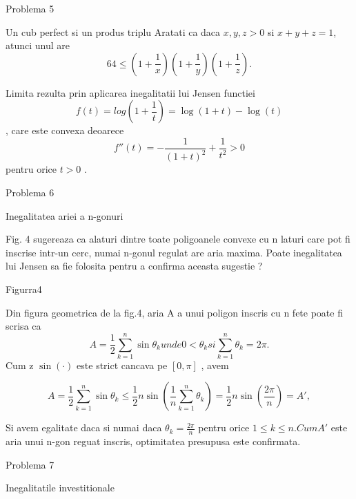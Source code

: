 \documentclass[a4paper,12pt,oneside]{report}
\begin{document}
Problema 5 

Un cub perfect si un produs triplu
Aratati ca daca \(x , y , z > 0\) si \(x+ y + z = 1\), atunci unul are 
\begin{displaymath}
  64 \leq \left ( 1 + \frac{1}{x} \right )\left ( 1 + \frac{1}{y} \right )\left ( 1 + \frac{1}{z} \right ). 
\end{displaymath}

Limita rezulta prin aplicarea inegalitatii lui Jensen functiei 
\begin{displaymath}
  f\left ( t \right ) = log \left ( 1+\frac{1}{t} \right ) = \log \left ( 1 + t \right ) - \log \left ( t \right )
\end{displaymath},
care este convexa deoarece 
\begin{displaymath}
  {f}''\left ( t \right ) = -\frac{1}{\left ( 1 + t \right )^{2}} + \frac{1}{t^{2}} > 0
\end{displaymath} 
pentru orice \(t > 0\) . 


Problema 6 

Inegalitatea ariei a n-gonuri

Fig. 4 sugereaza ca alaturi dintre toate poligoanele convexe cu n laturi care pot fi inscrise intr-un cerc, numai n-gonul regulat are aria maxima. Poate inegalitatea lui Jensen sa fie folosita pentru a confirma aceasta sugestie ?

Figurra4

Din figura geometrica de la fig.4, aria A a unui poligon inscris cu n fete poate fi scrisa ca 
\begin{displaymath}
  A = \frac{1}{2}\sum_{k = 1}^{n} \sin \theta _{k} unde 0< \theta _{k} si \sum_{k = 1}^n{\theta _{k}} = 2\pi. 
\end{displaymath}
	Cum z \(\sin \left ( \cdot  \right )\) este strict cancava pe \(\left [ 0 , \pi  \right ]\) , avem 

\begin{displaymath}
  A = \frac{1}{2}\sum_{k = 1}^{n} \sin \theta _{k}  \leq \frac{1}{2}n\sin\left ( \frac{1}{n}\sum_{k = 1}^{n}\theta _{k} \right ) = \frac{1}{2}n\sin \left ( \frac{2\pi }{n} \right ) = {A}',
\end{displaymath}

Si avem egalitate daca si numai daca \(\theta _{k} = \frac{2\pi }{n}\) pentru orice \(1\leq k\leq n. Cum {A}'\) este aria unui n-gon reguat inscris, optimitatea presupusa este confirmata. 


Problema 7

Inegalitatile investitionale 
\end{document}
